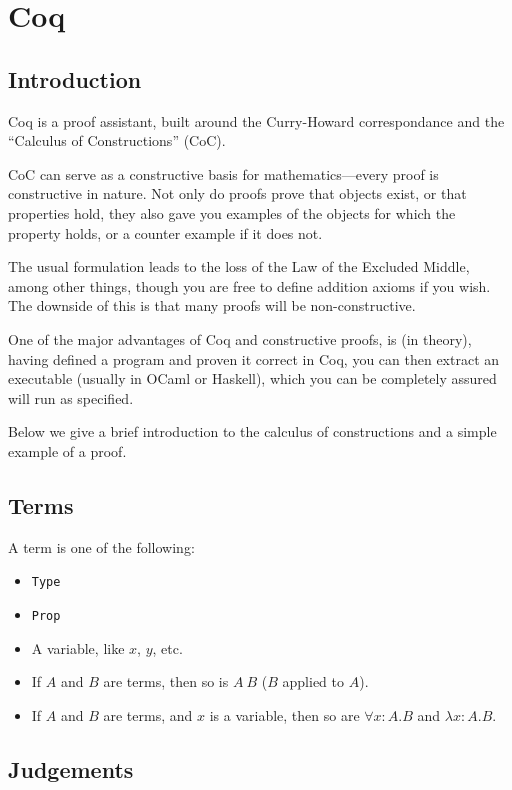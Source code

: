 \documentclass[10pt]{article}
\begin{document}
\section{Coq}

\subsection{Introduction}

Coq is a proof assistant, built around the Curry-Howard correspondance and the ``Calculus of Constructions'' (CoC).

CoC can serve as a constructive basis for mathematics---every proof is constructive in nature.
Not only do proofs prove that objects exist, or that properties hold, they also gave you examples of the objects for which the property holds, or a counter example if it does not.

The usual formulation leads to the loss of the Law of the Excluded Middle, among other things, though you are free to define addition axioms if you wish.
The downside of this is that many proofs will be non-constructive.

One of the major advantages of Coq and constructive proofs, is (in theory), having defined a program and proven it correct in Coq, you can then extract an executable (usually in OCaml or Haskell), which you can be completely assured will run as specified.

Below we give a brief introduction to the calculus of constructions and a simple example of a proof.

\subsection{Terms}

A term is one of the following:

\begin{itemize}
    \item \texttt{Type}
    \item \texttt{Prop}
    \item A variable, like $x$, $y$, etc.
    \item If $A$ and $B$ are terms, then so is $A~B$ ($B$ applied to $A$).
    \item If $A$ and $B$ are terms, and $x$ is a variable, then so are $\forall x : A.B$ and $\lambda x : A.B$.
\end{itemize}

\subsection{Judgements}
\end{document}
